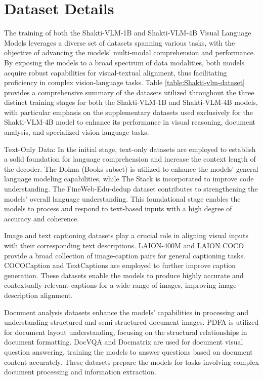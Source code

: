 \documentclass{article}
\begin{document}
\section{Dataset Details }
The training of both the Shakti-VLM-1B and Shakti-VLM-4B Visual Language Models leverages a diverse set of datasets spanning various tasks, with the objective of advancing the models' multi-modal comprehension and performance. By exposing the models to a broad spectrum of data modalities, both models acquire robust capabilities for visual-textual alignment, thus facilitating proficiency in complex vision-language tasks. Table \ref{table:Shakti-vlm-dataset}
provides a comprehensive summary of the datasets utilized throughout the three distinct training stages for both the Shakti-VLM-1B and Shakti-VLM-4B models, with particular emphasis on the supplementary datasets used exclusively for the Shakti-VLM-4B model to enhance its performance in visual reasoning, document analysis, and specialized vision-language tasks. 

Text-Only Data: In the initial stage, text-only datasets are employed to establish a solid foundation for language comprehension and increase the context length of the decoder. The Dolma (Books subset)\cite{soldaini2024dolmaopencorpustrillion} is utilized to enhance the models' general language modeling capabilities, while The Stack\cite{Kocetkov2022TheStack} is incorporated to improve code understanding. The FineWeb-Edu-dedup\cite{penedo2024thefineweb} dataset contributes to strengthening the models' overall language understanding. This foundational stage enables the models to process and respond to text-based inputs with a high degree of accuracy and coherence. 

Image and text captioning datasets play a crucial role in aligning visual inputs with their corresponding text descriptions. LAION-400M\cite{schuhmann2022laion5bopenlargescaledataset} and LAION COCO\cite{laioncoco} provide a broad collection of image-caption pairs for general captioning tasks. COCOCaption\cite{chen2015microsoftcococaptionsdata} and TextCaptions\cite{sidorov2019textcaps} are employed to further improve caption generation. These datasets enable the models to produce highly accurate and contextually relevant captions for a wide range of images, improving image-description alignment. 

Document analysis datasets enhance the models' capabilities in processing and understanding structured and semi-structured document images. PDFA\cite{pixparse_pdfa_eng_wds} is utilized for document layout understanding, focusing on the structural relationships in document formatting. DocVQA\cite{mathew2021docvqa} and Docmatrix\cite{laurençon2024buildingbetterunderstandingvisionlanguage} are used for document visual question answering, training the models to answer questions based on document content accurately. These datasets prepare the models for tasks involving complex document processing and information extraction. 
\end{document}
